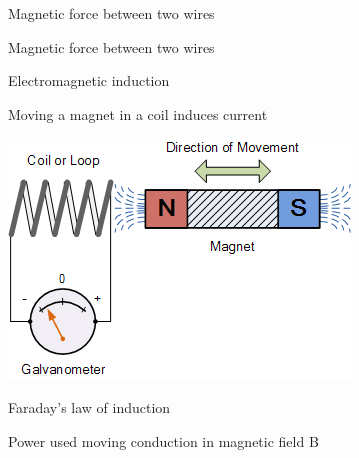 \documentclass[compress]{beamer}
\begin{document}
{
    \begin{frame}{Magnetic force between two wires}
    \end{frame}
}


{
    \begin{frame}{Magnetic force between two wires}
    \end{frame}
}


\begin{frame}{Electromagnetic induction}

  Moving a magnet in a coil induces current


    \begin{center}
        \includegraphics[width=0.6\linewidth]{../part3/figs/image29}


    \end{center}
\end{frame}


{
    \begin{frame}{Faraday's law of induction}
    \end{frame}
}


{
    \begin{frame}{Power used moving conduction in magnetic field B}
    \end{frame}
}
\end{document}
